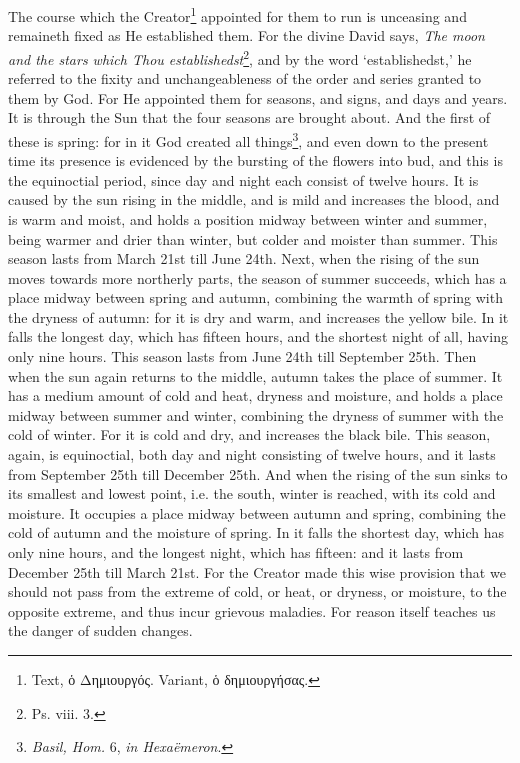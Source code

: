 The course which the Creator\footnote{Text, \textgreek{ὁ Δημιουργός}. Variant, \textgreek{ὁ δημιουργήσας}.} appointed for them to run is unceasing and remaineth fixed as He established them. For the divine David says, \emph{The moon and the stars which Thou establishedst}\footnote{Ps. viii. 3.}, and by the word ‘establishedst,’ he referred to the fixity and unchangeableness of the order and series granted to them by God. For He appointed them for seasons, and signs, and days and years. It is through the Sun that the four seasons are brought about. And the first of these is spring: for in it God created all things\footnote{\emph{Basil, Hom. }6, \emph{in Hexaëmeron}.}, and even down to the present time its presence is evidenced by the bursting of the flowers into bud, and this is the equinoctial period, since day and night each consist of twelve hours. It is caused by the sun rising in the middle, and is mild and increases the blood, and is warm and moist, and holds a position midway between winter and summer, being warmer and drier than winter, but colder and moister than summer. This season lasts from March 21st till June 24th. Next, when the rising of the sun moves towards more northerly parts, the season of summer succeeds, which has a place midway between spring and autumn, combining the warmth of spring with the dryness of autumn: for it is dry and warm, and increases the yellow bile. In it falls the longest day, which has fifteen hours, and the shortest night of all, having only nine hours. This season lasts from June 24th till September 25th. Then when the sun again returns to the middle, autumn takes the place of summer. It has a medium amount of cold and heat, dryness and moisture, and holds a place midway between summer and winter, combining the dryness of summer with the cold of winter. For it is cold and dry, and increases the black bile. This season, again, is equinoctial, both day and night consisting of twelve hours, and it lasts from September 25th till December 25th. And when the rising of the sun sinks to its smallest and lowest point, i.e. the south, winter is reached, with its cold and moisture. It occupies a place midway between autumn and spring, combining the cold of autumn and the moisture of spring. In it falls the shortest day, which has only nine hours, and the longest night, which has fifteen: and it lasts from December 25th till March 21st. For the Creator made this wise provision that we should not pass from the extreme of cold, or heat, or dryness, or moisture, to the opposite extreme, and thus incur grievous maladies. For reason itself teaches us the danger of sudden changes.

